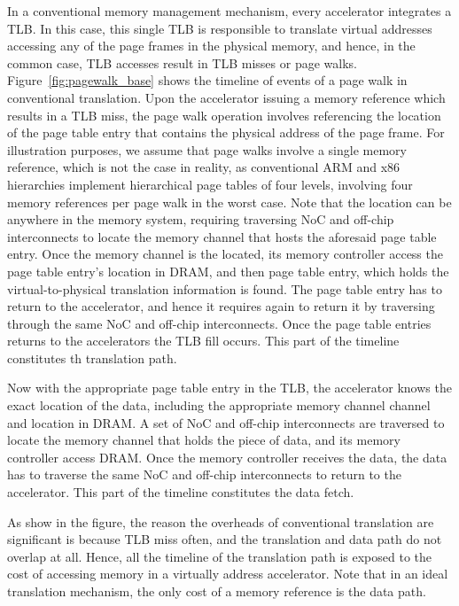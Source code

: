 In a conventional memory management mechanism, every accelerator integrates a TLB. In this case, this single TLB is responsible to translate virtual addresses accessing any of the page frames in the physical memory, and hence, in the common case, TLB accesses result in TLB misses or page walks. Figure~\ref{fig:pagewalk_base} shows the timeline of events of a page walk in conventional translation. Upon the accelerator issuing a memory reference which results in a TLB miss, the page walk operation involves referencing the location of the page table entry that contains the physical address of the page frame. For illustration purposes, we assume that page walks involve a single memory reference, which is not the case in reality, as conventional ARM and x86 hierarchies implement hierarchical page tables of four levels, involving four memory references per page walk in the worst case. Note that the location can be anywhere in the memory system, requiring traversing NoC and off-chip interconnects to locate the memory channel that hosts the aforesaid page table entry. Once the memory channel is the located, its memory controller access the page table entry's location in DRAM, and then page table entry, which holds the virtual-to-physical translation information is found. The page table entry has to return to the accelerator, and hence it requires again to return it by traversing through the same NoC and off-chip interconnects. Once the page table entries returns to the accelerators the TLB fill occurs. This part of the timeline constitutes th translation path. 

Now with the appropriate page table entry in the TLB, the accelerator knows the exact location of the data, including the appropriate memory channel channel and location in DRAM. A set of NoC and off-chip interconnects are traversed to locate the memory channel that holds the piece of data, and its memory controller access DRAM. Once the memory controller receives the data, the data has to traverse the same NoC and off-chip interconnects to return to the accelerator. This part of the timeline constitutes the data fetch.

As show in the figure, the reason the overheads of conventional translation are significant is because TLB miss often, and the translation and data path do not overlap at all. Hence, all the timeline of the translation path is exposed to the cost of accessing memory in a virtually address accelerator. Note that in an ideal translation mechanism, the only cost of a memory reference is the data path.

